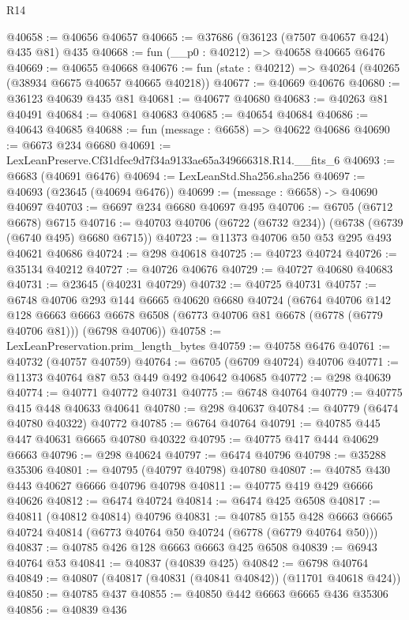 \begin{lexlean}{R14}
\begin{coremodule}
@40658 := @40656 @40657
@40665 := @37686 (@36123 (@7507 @40657 @424) @435 @81) @435
@40668 := fun (__p0 : @40212) => @40658 @40665 @6476
@40669 := @40655 @40668
@40676 := fun (state : @40212) => @40264 (@40265 (@38934 @6675 @40657 @40665 @40218))
@40677 := @40669 @40676
@40680 := @36123 @40639 @435 @81
@40681 := @40677 @40680
@40683 := @40263 @81 @40491
@40684 := @40681 @40683
@40685 := @40654 @40684
@40686 := @40643 @40685
@40688 := fun (message : @6658) => @40622 @40686
@40690 := @6673 @234 @6680
@40691 := LexLeanPreserve.Cf31dfec9d7f34a9133ae65a349666318.R14.__fits_6
@40693 := @6683 (@40691 @6476)
@40694 := LexLeanStd.Sha256.sha256
@40697 := @40693 (@23645 (@40694 @6476))
@40699 := (message : @6658) -> @40690 @40697
@40703 := @6697 @234 @6680 @40697 @495
@40706 := @6705 (@6712 @6678) @6715
@40716 := @40703 @40706 (@6722 (@6732 @234)) (@6738 (@6739 (@6740 @495) @6680 @6715))
@40723 := @11373 @40706 @50 @53 @295 @493 @40621 @40686
@40724 := @298 @40618
@40725 := @40723 @40724
@40726 := @35134 @40212
@40727 := @40726 @40676
@40729 := @40727 @40680 @40683
@40731 := @23645 (@40231 @40729)
@40732 := @40725 @40731
@40757 := @6748
    @40706
    @293
    @144
    @6665
    @40620
    @6680
    @40724
    (@6764
      @40706
      @142
      @128
      @6663
      @6663
      @6678
      @6508
      (@6773 @40706 @81 @6678 (@6778 (@6779 @40706 @81)))
      (@6798 @40706))
@40758 := LexLeanPreservation.prim_length_bytes
@40759 := @40758 @6476
@40761 := @40732 (@40757 @40759)
@40764 := @6705 (@6709 @40724) @40706
@40771 := @11373 @40764 @87 @53 @449 @492 @40642 @40685
@40772 := @298 @40639
@40774 := @40771 @40772 @40731
@40775 := @6748 @40764
@40779 := @40775 @415 @448 @40633 @40641
@40780 := @298 @40637
@40784 := @40779 (@6474 @40780 @40322) @40772
@40785 := @6764 @40764
@40791 := @40785 @445 @447 @40631 @6665 @40780 @40322
@40795 := @40775 @417 @444 @40629 @6663
@40796 := @298 @40624
@40797 := @6474 @40796
@40798 := @35288 @35306
@40801 := @40795 (@40797 @40798) @40780
@40807 := @40785 @430 @443 @40627 @6666 @40796 @40798
@40811 := @40775 @419 @429 @6666 @40626
@40812 := @6474 @40724
@40814 := @6474 @425 @6508
@40817 := @40811 (@40812 @40814) @40796
@40831 := @40785
    @155
    @428
    @6663
    @6665
    @40724
    @40814
    (@6773 @40764 @50 @40724 (@6778 (@6779 @40764 @50)))
@40837 := @40785 @426 @128 @6663 @6663 @425 @6508
@40839 := @6943 @40764 @53
@40841 := @40837 (@40839 @425)
@40842 := @6798 @40764
@40849 := @40807 (@40817 (@40831 (@40841 @40842)) (@11701 @40618 @424))
@40850 := @40785 @437
@40855 := @40850 @442 @6663 @6665 @436 @35306
@40856 := @40839 @436

\end{coremodule}
\end{lexlean}
